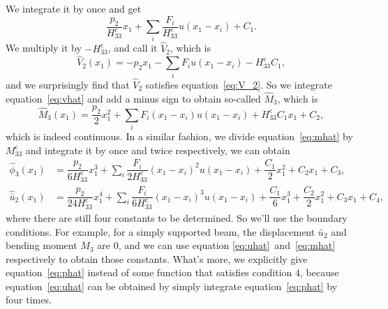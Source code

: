\documentclass{article}
\begin{document}
We integrate it by once and get
\[
\dfrac{p_2}{H_{33}^{\text{c}}} x_1 + \sum_i \dfrac{F_i}{H_{33}^{\text{c}}} u(x_1 - x_i) + C_1.
\]
We multiply it by $-H_{33}^{\text{c}}$, and call it $\hat{V}_2$, which is
\begin{equation}
\hat{V}_2(x_1) = -p_2 x_1 - \sum_i F_i u(x_1 - x_i) - H_{33}^{\text{c}} C_1,
\label{eq:vhat}
\end{equation}
and we surprisingly find that $\hat{V}_2$ satisfies equation~\ref{eq:V_2}. So we integrate equation~\ref{eq:vhat} and add a minus sign to obtain so-called $\hat{M}_3$, which is
\begin{equation}
\hat{M}_3(x_1) = \dfrac{p_2}{2} x_1^2 + \sum_i F_i (x_1 - x_i) u(x_1 - x_i) + H_{33}^{\text{c}} C_1 x_1 + C_2,
\label{eq:mhat}
\end{equation}
which is indeed continuous. In a similar fashion, we divide equation~\ref{eq:mhat} by $M_{33}^{\text{c}}$ and integrate it by once and twice respectively, we can obtain
\begin{align}
\hat{\phi}_3(x_1) &= \dfrac{p_2}{6 H_{33}^{\text{c}}} x_1^3 + \sum_i \dfrac{F_i}{2 H_{33}^{\text{c}}} (x_1 - x_i)^2 u(x_1 - x_i) + \dfrac{C_1}{2} x_1^2 + C_2 x_1 + C_3, \label{eq:phihat} \\
\hat{\bar{u}}_2(x_1) &= \dfrac{p_2}{24 H_{33}^{\text{c}}} x_1^4 + \sum_i \dfrac{F_i}{6 H_{33}^{\text{c}}} (x_1 - x_i)^3 u(x_1 - x_i) + \dfrac{C_1}{6} x_1^3 + \dfrac{C_2}{2} x_1^2 + C_3 x_1 + C_4, \label{eq:uhat}
\end{align}
where there are still four constants to be determined. So we'll use the boundary conditions. For example, for a simply supported beam, the displacement $\bar{u}_2$ and bending moment $M_3$ are $0$, and we can use equation \ref{eq:uhat}~and~\ref{eq:mhat} respectively to obtain those constants. What's more, we explicitly give equation~\ref{eq:phat} instead of some function that satisfies condition 4, because equation~\ref{eq:uhat} can be obtained by simply integrate equation~\ref{eq:phat} by four times.
\end{document}
